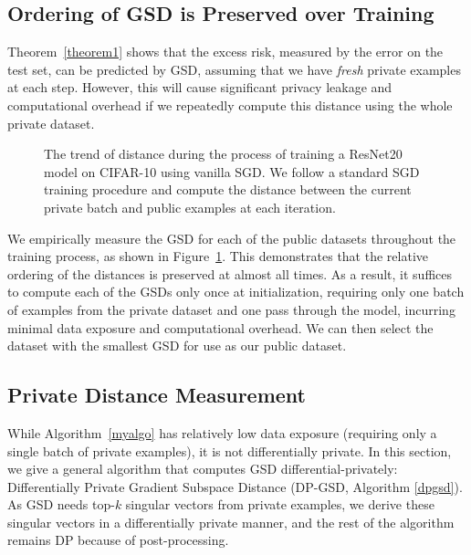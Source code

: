 \documentclass[11pt]{article}
\begin{document}
\subsection{Ordering of GSD is Preserved over Training}\label{sec:uniform-distance}
Theorem~\ref{theorem1} shows that the excess risk, measured by the error on the test set, can be predicted by GSD, assuming that we have \textit{fresh} private examples at each step. However, this will cause significant privacy leakage and computational overhead if we repeatedly compute this distance using the whole private dataset. 

\begin{figure}[!h]
    \centering
    \hfil
    \caption{The trend of distance during the process of training a ResNet20 model on CIFAR-10 using vanilla SGD. We follow a standard SGD training procedure and compute the distance between the current private batch and public examples at each iteration.}
    \label{distance}
\end{figure}

We empirically measure the GSD for each of the public datasets throughout the training process, as shown in Figure~\ref{distance}. 
This demonstrates that the relative ordering of the distances is preserved at almost all times.  
As a result, it suffices to compute each of the GSDs only once at initialization, requiring only one batch of examples from the private dataset and one pass through the model, incurring minimal data exposure and computational overhead.
We can then select the dataset with the smallest GSD for use as our public dataset.

\subsection{Private Distance Measurement}\label{sec:priv-gsd}
While Algorithm~\ref{myalgo} has relatively low data exposure (requiring only a single batch of private examples), it is not differentially private. 
In this section, we give a general algorithm that computes GSD differential-privately: Differentially Private Gradient Subspace Distance (DP-GSD, Algorithm \ref{dpgsd}). As GSD needs top-$k$ singular vectors from private examples, we derive these singular vectors in a differentially private manner, and the rest of the algorithm remains DP because of post-processing.
\end{document}
